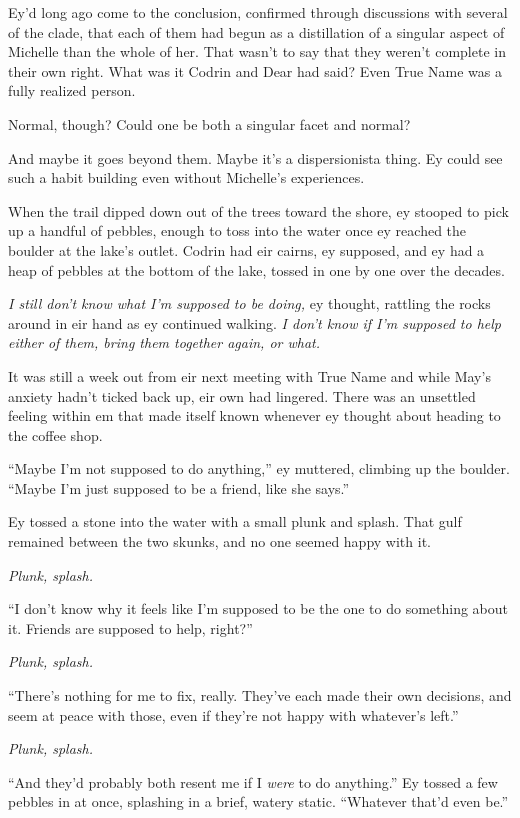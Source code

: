 Ey'd long ago come to the conclusion, confirmed through discussions with several of the clade, that each of them had begun as a distillation of a singular aspect of Michelle than the whole of her. That wasn't to say that they weren't complete in their own right. What was it Codrin and Dear had said? Even True Name was a fully realized person.

Normal, though? Could one be both a singular facet and normal?

And maybe it goes beyond them. Maybe it's a dispersionista thing. Ey could see such a habit building even without Michelle's experiences.

When the trail dipped down out of the trees toward the shore, ey stooped to pick up a handful of pebbles, enough to toss into the water once ey reached the boulder at the lake's outlet. Codrin had eir cairns, ey supposed, and ey had a heap of pebbles at the bottom of the lake, tossed in one by one over the decades.

\emph{I still don't know what I'm supposed to be doing,} ey thought, rattling the rocks around in eir hand as ey continued walking. \emph{I don't know if I'm supposed to help either of them, bring them together again, or what.}

It was still a week out from eir next meeting with True Name and while May's anxiety hadn't ticked back up, eir own had lingered. There was an unsettled feeling within em that made itself known whenever ey thought about heading to the coffee shop.

``Maybe I'm not supposed to do anything,'' ey muttered, climbing up the boulder. ``Maybe I'm just supposed to be a friend, like she says.''

Ey tossed a stone into the water with a small plunk and splash. That gulf remained between the two skunks, and no one seemed happy with it.

\emph{Plunk, splash.}

``I don't know why it feels like I'm supposed to be the one to do something about it. Friends are supposed to help, right?''

\emph{Plunk, splash.}

``There's nothing for me to fix, really. They've each made their own decisions, and seem at peace with those, even if they're not happy with whatever's left.''

\emph{Plunk, splash.}

``And they'd probably both resent me if I \emph{were} to do anything.'' Ey tossed a few pebbles in at once, splashing in a brief, watery static. ``Whatever that'd even be.''

